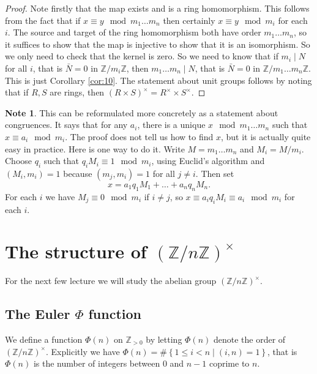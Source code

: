 \documentclass{article}
\newcommand{\Z}{\mathbb{Z}}
\newcommand{\rb}[1]{\left( #1 \right)}
\newcommand{\cb}[1]{\left\{ #1 \right\}}
\newcommand{\unit}[1]{\rb{\Z / #1\Z}^\times}
\theoremstyle{definition}\newtheorem{definition}{Definition}
\theoremstyle{definition}\newtheorem{remark}[definition]{Remark}
\theoremstyle{definition}\newtheorem*{example}{Example}
\theoremstyle{definition}\newtheorem*{note}{Note}
\begin{document}
\begin{proof}
Note firstly that the map exists and is a ring homomorphism. This follows from the fact that if $ x \equiv y \mod m_1 \dots m_n $ then certainly $ x \equiv y \mod m_i $ for each $ i $. The source and target of the ring homomorphism both have order $ m_1 \dots m_n $, so it suffices to show that the map is injective to show that it is an isomorphism. So we only need to check that the kernel is zero. So we need to know that if $ m_i \mid N $ for all $ i $, that is $ \bar{N} = 0 $ in $ \Z / m_i\Z $, then $ m_1 \dots m_n \mid N $, that is $ \bar{N} = 0 $ in $ \Z / m_1 \dots m_n\Z $. This is just Corollary \ref{cor:10}. The statement about unit groups follows by noting that if $ R, S $ are rings, then $ \rb{R \times S}^\times = R^\times \times S^\times $.
\end{proof}

\begin{note}
This can be reformulated more concretely as a statement about congruences. It says that for any $ a_i $, there is a unique $ x \mod m_1 \dots m_n $ such that $ x \equiv a_i \mod m_i $. The proof does not tell us how to find $ x $, but it is actually quite easy in practice. Here is one way to do it. Write $ M = m_1 \dots m_n $ and $ M_i = M / m_i $. Choose $ q_i $ such that $ q_iM_i \equiv 1 \mod m_i $, using Euclid's algorithm and $ \rb{M_i, m_i} = 1 $ because $ \rb{m_j, m_i} = 1 $ for all $ j \ne i $. Then set
$$ x = a_1q_1M_1 + \dots + a_nq_nM_n. $$
For each $ i $ we have $ M_j \equiv 0 \mod m_i $ if $ i \ne j $, so $ x \equiv a_iq_iM_i \equiv a_i \mod m_i $ for each $ i $.
\end{note}

\section{The structure of $ \unit{n} $}

For the next few lecture we will study the abelian group $ \unit{n} $.

\subsection{The Euler $ \Phi $ function}

We define a function $ \Phi\rb{n} $ on $ \Z_{> 0} $ by letting $ \Phi\rb{n} $ denote the order of $ \unit{n} $. Explicitly we have $ \Phi\rb{n} = \#\cb{1 \le i < n \mid \rb{i, n} = 1} $, that is $ \Phi\rb{n} $ is the number of integers between $ 0 $ and $ n - 1 $ coprime to $ n $.
\end{document}
